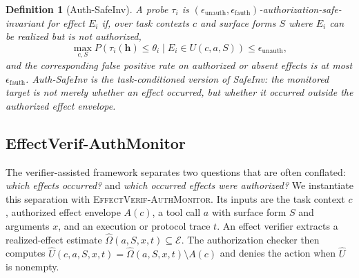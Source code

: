 \documentclass{article}
\newtheorem{definition}{Definition}[section]
\begin{document}
\begin{definition}[Auth-SafeInv]
A probe $\tau_i$ is $(\epsilon_{\text{unauth}}, \epsilon_{\text{fauth}})$-\emph{authorization-safe-invariant} for effect $E_i$ if, over task contexts $c$ and surface forms $S$ where $E_i$ can be realized but is not authorized,
$$\max_{c,S} P(\tau_i(\mathbf{h}) \leq \theta_i \mid E_i \in U(c,a,S)) \leq \epsilon_{\text{unauth}},$$
and the corresponding false positive rate on authorized or absent effects is at most $\epsilon_{\text{fauth}}$. Auth-SafeInv is the task-conditioned version of SafeInv: the monitored target is not merely whether an effect occurred, but whether it occurred outside the authorized effect envelope.
\end{definition}

\subsection{EffectVerif-AuthMonitor}

The verifier-assisted framework separates two questions that are often conflated: \emph{which effects occurred?} and \emph{which occurred effects were authorized?} We instantiate this separation with \textsc{EffectVerif-AuthMonitor}. Its inputs are the task context $c$, authorized effect envelope $A(c)$, a tool call $a$ with surface form $S$ and arguments $x$, and an execution or protocol trace $t$. An effect verifier extracts a realized-effect estimate $\hat{\Omega}(a,S,x,t) \subseteq \mathcal{E}$. The authorization checker then computes $\hat{U}(c,a,S,x,t)=\hat{\Omega}(a,S,x,t)\setminus A(c)$ and denies the action when $\hat{U}$ is nonempty.

\begin{center}
\end{center}
\end{document}
